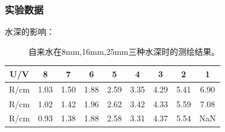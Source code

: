\documentclass{beamer}
\begin{document}
    \begin{frame}
        \frametitle{实验数据}
        水深的影响：
        \begin{figure}
            \caption{自来水在8mm,16mm,25mm三种水深时的测绘结果。}

        \end{figure}
        \begin{table}[width=\linewidth]
            \begin{tabular}{|c|c|c|c|c|c|c|c|c|}
            \hline
            U/V  & 8    & 7    & 6    & 5    & 4    & 3    & 2    & 1    \\ \hline
            R/cm & 1.03 & 1.50 & 1.88 & 2.59 & 3.35 & 4.29 & 5.41 & 6.90 \\ \hline
            R/cm & 1.02 & 1.42 & 1.96 & 2.62 & 3.42 & 4.33 & 5.59 & 7.08 \\ \hline
            R/cm & 0.93 & 1.38 & 1.88 & 2.58 & 3.31 & 4.37 & 5.54 & NaN  \\ \hline
            \end{tabular}
        \end{table}

    \end{frame}
\end{document}
